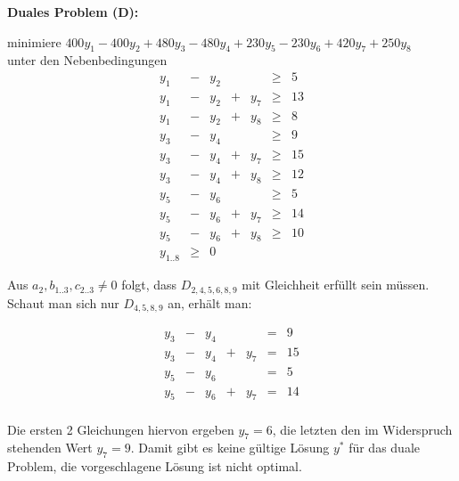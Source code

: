 \documentclass[a4paper,11pt]{article}
\begin{document}
\begin{enumerate}
        \textbf{Duales Problem (D):}

        minimiere $400 y_1 - 400 y_2 + 480 y_3 - 480 y_4 + 230 y_5 - 230 y_6 + 420 y_7 + 250 y_8$\\
        unter den Nebenbedingungen \\
        \[\begin{array}{rcrcrcr}
            y_1 & - & y_2 &   &     &\geq& 5 \\
            y_1 & - & y_2 & + & y_7 &\geq& 13 \\
            y_1 & - & y_2 & + & y_8 &\geq& 8 \\
            y_3 & - & y_4 &   &     &\geq& 9 \\
            y_3 & - & y_4 & + & y_7 &\geq& 15 \\
            y_3 & - & y_4 & + & y_8 &\geq& 12 \\
            y_5 & - & y_6 &   &     &\geq& 5 \\
            y_5 & - & y_6 & + & y_7 &\geq& 14 \\
            y_5 & - & y_6 & + & y_8 &\geq& 10 \\
            y_{1..8} &\geq& 0
        \end{array}\]

        Aus $a_2, b_{1..3}, c_{2..3} \ne 0$ folgt, dass $D_{2,4,5,6,8,9}$
        mit Gleichheit erfüllt sein müssen. Schaut man sich nur $D_{4, 5, 8, 9}$ an,
        erhält man:

        \[\begin{array}{rcrcrcr}
        y_3 & - & y_4 &   &     & = & 9  \\
        y_3 & - & y_4 & + & y_7 & = & 15 \\
        y_5 & - & y_6 &   &     & = & 5  \\
        y_5 & - & y_6 & + & y_7 & = & 14 \\
        \end{array}\]

        Die ersten 2 Gleichungen hiervon ergeben $y_7 = 6$, die letzten den
        im Widerspruch stehenden Wert $y_7 = 9$. Damit gibt es keine gültige
        Lösung $y^*$ für das duale Problem, die vorgeschlagene Lösung ist nicht
        optimal.


\end{enumerate}
\end{document}
